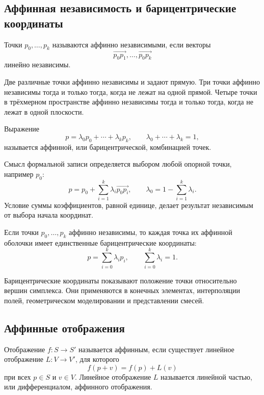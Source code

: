 \subsection{Аффинная независимость и барицентрические координаты}

\begin{definition}
Точки \(p_0,\dots,p_k\) называются аффинно независимыми, если векторы
\[
\overrightarrow{p_0p_1},\dots,\overrightarrow{p_0p_k}
\]
линейно независимы.
\end{definition}

Две различные точки аффинно независимы и задают прямую. Три точки аффинно независимы тогда и только тогда, когда не лежат на одной прямой. Четыре точки в трёхмерном пространстве аффинно независимы тогда и только тогда, когда не лежат в одной плоскости.

\begin{definition}
Выражение
\[
p=\lambda_0p_0+\cdots+\lambda_kp_k,
\qquad
\lambda_0+\cdots+\lambda_k=1,
\]
называется аффинной, или барицентрической, комбинацией точек.
\end{definition}

Смысл формальной записи определяется выбором любой опорной точки, например \(p_0\):
\[
p
=
p_0+
\sum_{i=1}^{k}\lambda_i\overrightarrow{p_0p_i},
\qquad
\lambda_0=1-\sum_{i=1}^{k}\lambda_i.
\]
Условие суммы коэффициентов, равной единице, делает результат независимым от выбора начала координат.

\begin{theorem}
Если точки \(p_0,\dots,p_k\) аффинно независимы, то каждая точка их аффинной оболочки имеет единственные барицентрические координаты:
\[
p=\sum_{i=0}^{k}\lambda_ip_i,
\qquad
\sum_{i=0}^{k}\lambda_i=1.
\]
\end{theorem}

Барицентрические координаты показывают положение точки относительно вершин симплекса. Они применяются в конечных элементах, интерполяции полей, геометрическом моделировании и представлении смесей.

\subsection{Аффинные отображения}

\begin{definition}
Отображение \(f:S\to S'\) называется аффинным, если существует линейное отображение \(L:V\to V'\), для которого
\[
f(p+v)=f(p)+L(v)
\]
при всех \(p\in S\) и \(v\in V\). Линейное отображение \(L\) называется линейной частью, или дифференциалом, аффинного отображения.
\end{definition}

